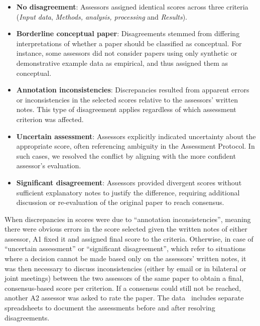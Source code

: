 \documentclass{josis}
\begin{document}
\begin{itemize}
    \item \textbf{No disagreement}: Assessors assigned identical scores across three criteria (\textit{Input data}, \textit{Methods, analysis, processing} and \textit{Results}).

    \item \textbf{Borderline conceptual paper}: Disagreements stemmed from differing interpretations of whether a paper should be classified as conceptual. For instance, some assessors did not consider papers using only synthetic or demonstrative example data as empirical, and thus assigned them as conceptual.

    \item \textbf{Annotation inconsistencies}: Discrepancies resulted from apparent errors or inconsistencies in the selected scores relative to the assessors’ written notes. This type of disagreement applies regardless of which assessment criterion was affected.

    \item \textbf{Uncertain assessment}: Assessors explicitly indicated uncertainty about the appropriate score, often referencing ambiguity in the Assessment Protocol\cite{assessment_protocol}. In such cases, we resolved the conflict by aligning with the more confident assessor’s evaluation.

    \item \textbf{Significant disagreement}: Assessors provided divergent scores without sufficient explanatory notes to justify the difference, requiring additional discussion or re-evaluation of the original paper to reach consensus.
\end{itemize}


When discrepancies in scores were due to ``annotation inconsistencies'', meaning there were obvious errors in the score selected given the written notes of either assessor, A1 fixed it and assigned final score to the criteria. 
Otherwise, in case of ``uncertain assessment'' or ``significant disagreement'', which refer to situations where a decision cannot be made based only on the assessors' written notes, it was then necessary to discuss inconsistencies (either by email or in bilateral or joint meetings) between the two assessors of the same paper to obtain a final, consensus-based score per criterion. If a consensus could still not be reached, another A2 assessor was asked to rate the paper. The data~\cite{data} includes separate spreadsheets to document the assessments before and after resolving disagreements.
\end{document}

